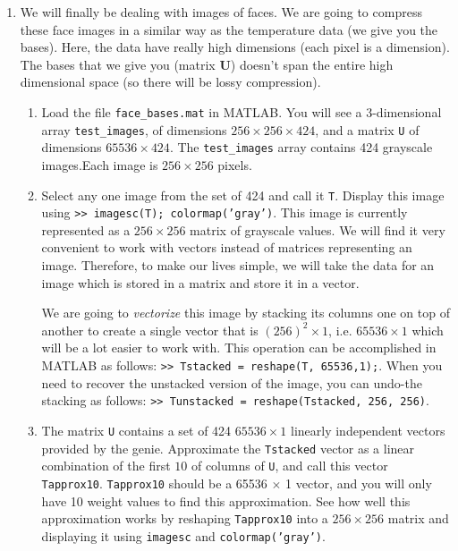 \begin{prob}
\begin{enumerate}
\item We will finally be dealing with images of faces. We are going to compress these face images in a similar way as the temperature data (we give you the bases). Here, the data have really high dimensions (each pixel is a dimension). The bases that we give you (matrix $\mathbf{U}$) doesn't span the entire high dimensional space (so there will be lossy compression).

\begin{enumerate}

\item Load the file \texttt{face\_bases.mat} in MATLAB. You will see a 3-dimensional array \texttt{test\_images}, of dimensions $256\times 256\times 424$, and a matrix \texttt{U} of dimensions $65536 \times 424$. The \texttt{test\_images} array contains 424 grayscale images.Each image is $256 \times 256$ pixels.

\item Select any one image from the set of 424 and call it \texttt{T}. Display this image using \texttt{>> imagesc(T); colormap('gray')}. This image is currently represented as a $256 \times 256$ matrix of grayscale values. We will find it very convenient to work with vectors instead of matrices representing an image. Therefore, to make our lives simple, we will take the data for an image which is stored in a matrix and store it in a vector.

We are going to \emph{vectorize} this image by stacking its columns one on top of another to create a single vector that is $(256)^2 \times 1$, i.e. $65536 \times 1$ which will be a lot easier to work with. This operation can be accomplished in MATLAB as follows: \texttt{>> Tstacked = reshape(T, 65536,1);}. When you need to recover the unstacked version of the image, you can undo-the stacking as follows: \texttt{>> Tunstacked = reshape(Tstacked, 256, 256)}.

\item The matrix \texttt{U} contains a set of 424 $65536 \times 1$ linearly independent vectors provided by the genie. Approximate the \texttt{Tstacked} vector as a linear combination of the first $10$ of columns of \texttt{U}, and call this vector \texttt{Tapprox10}. \texttt{Tapprox10} should be a 65536 $\times$ 1 vector, and you will only have 10 weight values to find this approximation. See how well this approximation works by reshaping \texttt{Tapprox10} into a $256 \times 256$ matrix and displaying it using \texttt{imagesc} and \texttt{colormap('gray')}.


\end{enumerate}
\end{enumerate}
\end{prob}
